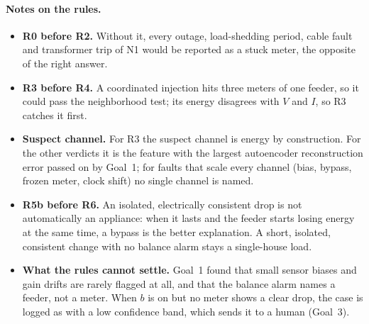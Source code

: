 \documentclass[11pt,a4paper]{article}
\begin{document}
\paragraph{Notes on the rules.}
\begin{itemize}[leftmargin=*,itemsep=2pt]
  \item \textbf{R0 before R2.} Without it, every outage, load-shedding period, cable fault and transformer trip
        of N1 would be reported as a stuck meter, the opposite of the right answer.
  \item \textbf{R3 before R4.} A coordinated injection hits three meters of one feeder, so it could pass the
        neighborhood test; its energy disagrees with $V$ and $I$, so R3 catches it first.
  \item \textbf{Suspect channel.} For R3 the suspect channel is energy by construction. For the other
        verdicts it is the feature with the largest autoencoder reconstruction error passed on by Goal~1; for
        faults that scale every channel (bias, bypass, frozen meter, clock shift) no single channel is
        named.
  \item \textbf{R5b before R6.} An isolated, electrically consistent drop is not automatically an appliance:
        when it lasts and the feeder starts losing energy at the same time, a bypass is the better
        explanation. A short, isolated, consistent change with no balance alarm stays a single-house load.
  \item \textbf{What the rules cannot settle.} Goal~1 found that small sensor biases and gain drifts are
        rarely flagged at all, and that the balance alarm names a feeder, not a meter. When $b$ is on but no
        meter shows a clear drop, the case is logged as \SD{} with a low confidence band, which sends it to
        a human (Goal~3).
\end{itemize}
\end{document}

